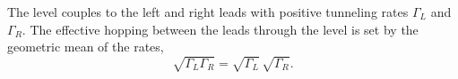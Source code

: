 \documentclass{article}
\begin{document}
The level couples to the left and right leads with positive tunneling rates $\Gamma_L$ and $\Gamma_R$.
The effective hopping between the leads through the level is set by the geometric mean of the rates,
\begin{equation}
\sqrt{\Gamma_L\Gamma_R} = \sqrt{\Gamma_L}\,\sqrt{\Gamma_R} .
\label{eq:geo}
\end{equation}
\end{document}
